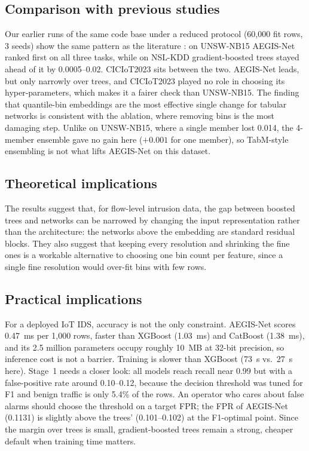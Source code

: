\documentclass[11pt,a4paper]{article}
\newcommand{\aegis}{AEGIS-Net}
\begin{document}
\subsection{Comparison with previous studies}\label{sec:previous}
Our earlier runs of the same code base under a reduced protocol (60{,}000 fit rows, 3 seeds) show the same pattern as the literature \cite{grinsztajn2022trees,shwartz2022tabular}: on UNSW-NB15 \cite{moustafa2015unsw} \aegis{} ranked first on all three tasks, while on NSL-KDD \cite{tavallaee2009nslkdd} gradient-boosted trees stayed ahead of it by 0.0005--0.02. CICIoT2023 sits between the two. \aegis{} leads, but only narrowly over trees, and CICIoT2023 played no role in choosing its hyper-parameters, which makes it a fairer check than UNSW-NB15. The finding that quantile-bin embeddings are the most effective single change for tabular networks \cite{gorishniy2022embeddings} is consistent with the ablation, where removing bins is the most damaging step. Unlike on UNSW-NB15, where a single member lost 0.014, the 4-member ensemble gave no gain here ($+0.001$ for one member), so TabM-style ensembling \cite{gorishniy2025tabm} is not what lifts \aegis{} on this dataset.

\subsection{Theoretical implications}\label{sec:theory}
The results suggest that, for flow-level intrusion data, the gap between boosted trees and networks can be narrowed by changing the input representation rather than the architecture: the networks above the embedding are standard residual blocks. They also suggest that keeping every resolution and shrinking the fine ones is a workable alternative to choosing one bin count per feature, since a single fine resolution would over-fit bins with few rows.

\subsection{Practical implications}\label{sec:practice}
For a deployed IoT IDS, accuracy is not the only constraint. \aegis{} scores 0.47~ms per 1{,}000 rows, faster than XGBoost (1.03~ms) and CatBoost (1.38~ms), and its 2.5 million parameters occupy roughly 10~MB at 32-bit precision, so inference cost is not a barrier. Training is slower than XGBoost (73~s vs.\ 27~s here). Stage~1 needs a closer look: all models reach recall near 0.99 but with a false-positive rate around 0.10--0.12, because the decision threshold was tuned for F1 and benign traffic is only 5.4\% of the rows. An operator who cares about false alarms should choose the threshold on a target FPR; the FPR of \aegis{} (0.1131) is slightly above the trees' (0.101--0.102) at the F1-optimal point. Since the margin over trees is small, gradient-boosted trees remain a strong, cheaper default when training time matters.
\end{document}
